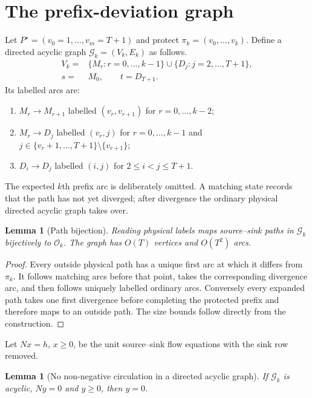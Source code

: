 \documentclass[11pt]{article}
\newtheorem{lemma}[theorem]{Lemma}
\theoremstyle{definition}
\newcommand{\cO}{\mathcal{O}}
\newcommand{\cG}{\mathcal{G}}
\begin{document}
\section{The prefix-deviation graph}\label{sec:graph}

Let $P^\star=(v_0=1,\ldots,v_m=T+1)$ and protect $\pi_k=(v_0,\ldots,v_k)$. Define a directed acyclic graph $\cG_k=(V_k,E_k)$ as follows.
\begin{align*}
V_k={}&\{M_r:r=0,\ldots,k-1\}\cup\{D_j:j=2,\ldots,T+1\},\\
s={}&M_0,\qquad t=D_{T+1}.
\end{align*}
Its labelled arcs are:
\begin{enumerate}[label=(\roman*)]
\item $M_r\to M_{r+1}$ labelled $(v_r,v_{r+1})$ for $r=0,\ldots,k-2$;
\item $M_r\to D_j$ labelled $(v_r,j)$ for $r=0,\ldots,k-1$ and $j\in\{v_r+1,\ldots,T+1\}\setminus\{v_{r+1}\}$;
\item $D_i\to D_j$ labelled $(i,j)$ for $2\le i<j\le T+1$.
\end{enumerate}
The expected $k$th prefix arc is deliberately omitted. A matching state records that the path has not yet diverged; after divergence the ordinary physical directed acyclic graph takes over.

\begin{lemma}[Path bijection]\label{lem:bijection}
Reading physical labels maps source--sink paths in $\cG_k$ bijectively to $\cO_k$. The graph has $O(T)$ vertices and $O(T^2)$ arcs.
\end{lemma}

\begin{proof}
Every outside physical path has a unique first arc at which it differs from $\pi_k$. It follows matching arcs before that point, takes the corresponding divergence arc, and then follows uniquely labelled ordinary arcs. Conversely every expanded path takes one first divergence before completing the protected prefix and therefore maps to an outside path. The size bounds follow directly from the construction.
\end{proof}

Let $Nx=h$, $x\ge0$, be the unit source--sink flow equations with the sink row removed.

\begin{lemma}[No non-negative circulation in a directed acyclic graph]\label{lem:dagcirculation}
If $\cG_k$ is acyclic, $Ny=0$ and $y\ge0$, then $y=0$.
\end{lemma}
\end{document}
